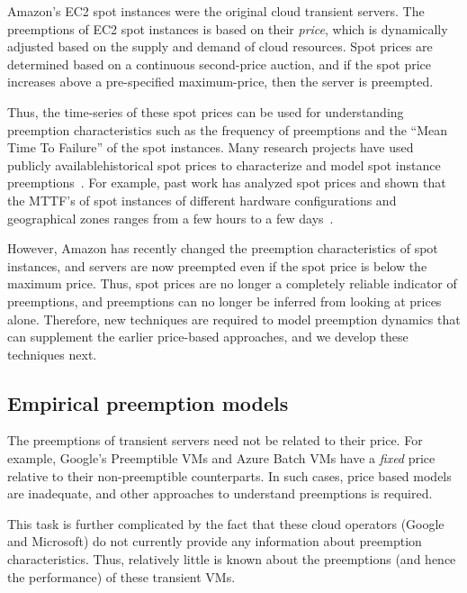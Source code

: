 Amazon's EC2 spot instances were the original cloud transient servers.
The preemptions of EC2 spot instances is based on their \emph{price}, which is dynamically adjusted based on the supply and demand of cloud resources.
Spot prices are determined based on a continuous second-price auction, and if the spot price increases above a pre-specified maximum-price, then the server is preempted.

Thus, the time-series of these spot prices can be used for understanding preemption characteristics such as the frequency of preemptions and the ``Mean Time To Failure'' of the spot instances.
Many research projects have used publicly available\footnotemark historical spot prices to characterize and model spot instance preemptions~\cite{spotcheck,how-to-bid}. %
For example, past work has analyzed spot prices and shown that the MTTF's of spot instances of different hardware configurations and geographical zones ranges from a few hours to a few days~\cite{prateek-thesis, shastri-thesis}. 



However, Amazon has recently changed the preemption characteristics of spot instances, and servers are now preempted even if the spot price is below the maximum price.
Thus, spot prices are no longer a completely reliable indicator of preemptions, and preemptions can no longer be inferred from looking at prices alone.
Therefore, new techniques are required to model preemption dynamics that can supplement the earlier price-based approaches, and we develop these techniques next.


\subsection{Empirical preemption models}

The preemptions of transient servers need not be related to their price.
For example, Google's Preemptible VMs and Azure Batch VMs have a \emph{fixed} price relative to their non-preemptible counterparts. 
In such cases, price based models are inadequate, and other approaches to understand preemptions is required.

This task is further complicated by the fact that these cloud operators (Google and Microsoft) do not currently provide any information about preemption characteristics. 
Thus, relatively little is known about the preemptions (and hence the performance) of these transient VMs. %

